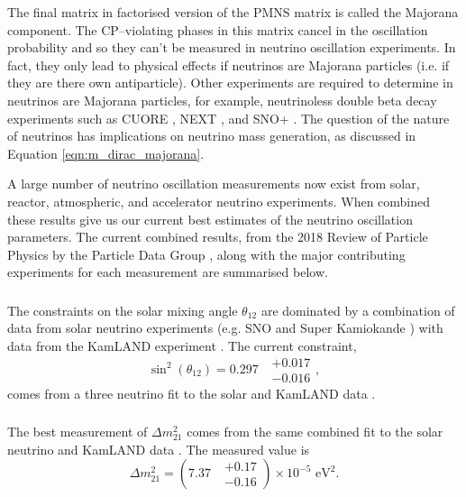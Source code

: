 {The final matrix in factorised version of the PMNS matrix is called the Majorana
component. The CP--violating phases in this matrix cancel in the oscillation
probability and so they can't be measured in neutrino oscillation experiments.
In fact, they only lead to physical effects if neutrinos are Majorana particles
(i.e. if they are there own antiparticle). Other experiments are required to 
determine in neutrinos are Majorana particles, for example, neutrinoless double
beta decay experiments such as CUORE \cite{Arnaboldi2004}, NEXT 
\cite{Alvarez2012}, and SNO+ \cite{Andringa2016}. The question of the nature of 
neutrinos has implications on neutrino mass generation, as discussed in Equation
\ref{eqn:m_dirac_majorana}.

A large number of neutrino oscillation measurements now exist from solar,
reactor, atmospheric, and accelerator neutrino experiments. When combined these
results give us our current best estimates of the neutrino oscillation
parameters. The current combined results, from the 2018 Review of Particle
Physics by the Particle Data Group \cite{PhysRevD.98.030001}, along with the 
major contributing experiments for each measurement are summarised below.

\subsubsection*{}
The constraints on the solar mixing angle $\theta_{12}$ are dominated by a
combination of data from solar neutrino experiments (e.g. SNO \cite{Ahmad2002}
and Super Kamiokande \cite{PhysRevLett.86.5651}) with data from the KamLAND 
experiment \cite{Araki2005}. The current constraint,
\begin{equation}
	\label{eqn:theta_12}
	\sin^2(\theta_{12}) = 0.297 \mbox{ } \substack{+ 0.017 \\ - 0.016},
\end{equation}
comes from a three neutrino fit to the solar and KamLAND data 
\cite{Capozzi:2016rtj, TODO}.

\subsubsection*{}
The best measurement of $\Delta m^2_{21}$ comes from the same combined fit to 
the solar neutrino and KamLAND data \cite{Capozzi:2016rtj, TODO}. The measured value
is
\begin{equation}
	\label{eqn:delta_m_21}
	\Delta m^2_{21} = (7.37 \mbox{ } \substack{+ 0.17 \\ - 0.16}) \times 10^{-5} \mbox{  eV}^2.
\end{equation}

}
